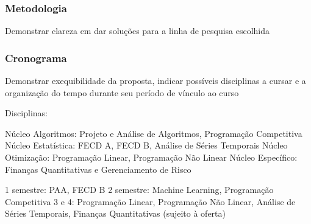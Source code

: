 \documentclass[a4paper, 12pt]{article}
\begin{document}
\subsubsection*{Metodologia}

Demonstrar clareza em dar soluções para a linha de pesquisa escolhida

\subsubsection*{Cronograma}

Demonstrar exequibilidade da proposta, indicar possíveis disciplinas a cursar
e a organização do tempo durante seu período de vínculo ao curso

Disciplinas:

Núcleo Algoritmos: Projeto e Análise de Algoritmos, Programação Competitiva
Núcleo Estatística: FECD A, FECD B, Análise de Séries Temporais
Núcleo Otimização: Programação Linear, Programação Não Linear
Núcleo Específico: Finanças Quantitativas e Gerenciamento de Risco

1 semestre: PAA, FECD B
2 semestre: Machine Learning, Programação Competitiva
3 e 4: Programação Linear, Programação Não Linear, Análise de Séries Temporais,
Finanças Quantitativas (sujeito à oferta)



\end{document}

